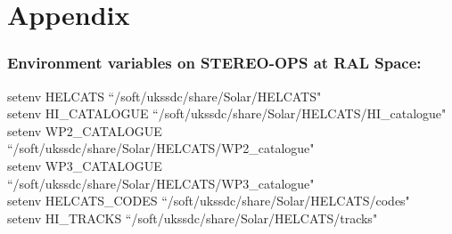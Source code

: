 \documentclass[12pt, a4paper, oneside]{article}
\begin{document}

\vspace{1cm}

\section*{\sc Appendix}

\subsubsection*{\sc Environment variables on STEREO-OPS at RAL Space:}
setenv HELCATS ``/soft/ukssdc/share/Solar/HELCATS"
\\
setenv HI\_CATALOGUE ``/soft/ukssdc/share/Solar/HELCATS/HI\_catalogue"
\\
setenv WP2\_CATALOGUE ``/soft/ukssdc/share/Solar/HELCATS/WP2\_catalogue"
\\
setenv WP3\_CATALOGUE ``/soft/ukssdc/share/Solar/HELCATS/WP3\_catalogue"
\\
setenv HELCATS\_CODES ``/soft/ukssdc/share/Solar/HELCATS/codes"
\\
setenv HI\_TRACKS ``/soft/ukssdc/share/Solar/HELCATS/tracks"
\end{document}
